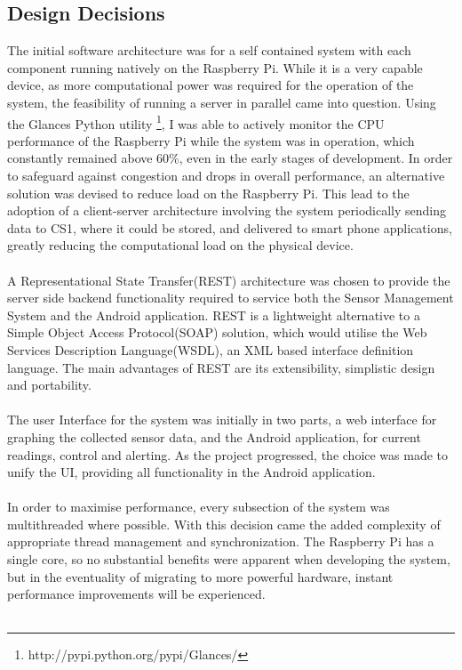 \documentclass{article}
\begin{document}
\subsection{Design Decisions}
The initial software architecture was for a self contained system with each component running natively on the Raspberry Pi. While it is a very capable device, as more computational power was required for the operation of the system, the feasibility of running a server in parallel came into question. Using the Glances Python utility \footnote{http://pypi.python.org/pypi/Glances/}, I was able to actively monitor the CPU performance of the Raspberry Pi while the system was in operation, which constantly remained above 60\%, even in the early stages of development. In order to safeguard against congestion and drops in overall performance, an alternative solution was devised to reduce load on the Raspberry Pi. This lead to the adoption of a client-server architecture involving the system periodically sending data to CS1, where it could be stored, and delivered to smart phone applications, greatly reducing the computational load on the physical device. \\\\
A Representational State Transfer(REST) architecture was chosen to provide the server side backend functionality required to service both the Sensor Management System and the Android application. REST is a lightweight alternative to a Simple Object Access Protocol(SOAP) solution, which would utilise the Web Services Description Language(WSDL), an XML based interface definition language. The main advantages of REST are its extensibility, simplistic design and portability. \\\\
The user Interface for the system was initially in two parts, a web interface for graphing the collected sensor data, and the Android application, for current readings, control and alerting. As the project progressed, the choice was made to unify the UI, providing all functionality in the Android application.  \\\\
In order to maximise performance, every subsection of the system was multithreaded where possible. With this decision came the added complexity of appropriate thread management and synchronization. The Raspberry Pi has a single core, so no substantial benefits were apparent when developing the system, but in the eventuality of migrating to more powerful hardware, instant performance improvements will be experienced. \\\\
\end{document}
